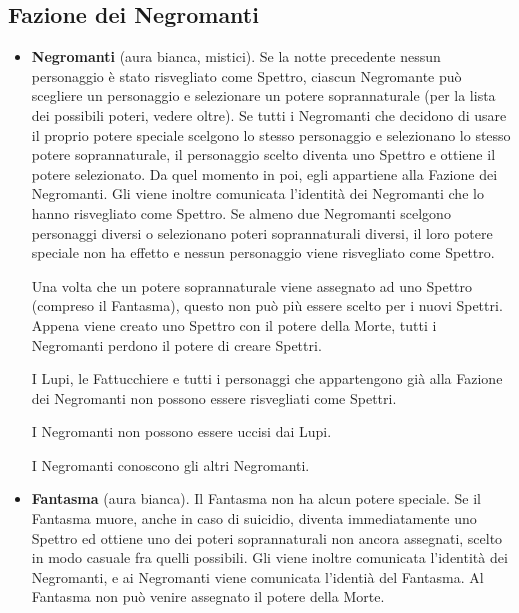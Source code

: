\documentclass[a4paper,10pt]{article}
\begin{document}
\subsection*{Fazione dei Negromanti}
\label{spettri}
\begin{itemize}

 \item {\bf Negromanti} (aura bianca, mistici). %
 Se la notte precedente nessun personaggio è stato risvegliato come Spettro, ciascun Negromante può scegliere un personaggio e selezionare un potere soprannaturale (per la lista dei possibili poteri, vedere oltre).
 Se tutti i Negromanti che decidono di usare il proprio potere speciale scelgono lo stesso personaggio e selezionano lo stesso potere soprannaturale, il personaggio scelto diventa uno Spettro e ottiene il potere selezionato.
 Da quel momento in poi, egli appartiene alla Fazione dei Negromanti. Gli viene inoltre comunicata l'identità dei Negromanti che lo hanno risvegliato come Spettro.
 Se almeno due Negromanti scelgono personaggi diversi o selezionano poteri soprannaturali diversi, il loro potere speciale non ha effetto e nessun personaggio viene risvegliato come Spettro.
 
 Una volta che un potere soprannaturale viene assegnato ad uno Spettro (compreso il Fantasma), questo non può più essere scelto per i nuovi Spettri. Appena viene creato uno Spettro con il potere della Morte, tutti i Negromanti perdono il potere di creare Spettri.
 
 I Lupi, le Fattucchiere e tutti i personaggi che appartengono già alla Fazione dei Negromanti non possono essere risvegliati come Spettri. %

 I Negromanti non possono essere uccisi dai Lupi.

 I Negromanti conoscono gli altri Negromanti.
 
 \item {\bf Fantasma} (aura bianca). Il Fantasma non ha alcun potere speciale. Se il Fantasma muore, anche in caso di suicidio, diventa immediatamente uno Spettro ed ottiene uno dei poteri soprannaturali non ancora assegnati, scelto in modo casuale fra quelli possibili. Gli viene inoltre comunicata l'identità dei Negromanti, e ai Negromanti viene comunicata l'identià del Fantasma.
 Al Fantasma non può venire assegnato il potere della Morte.
 

\end{itemize}
\end{document}
